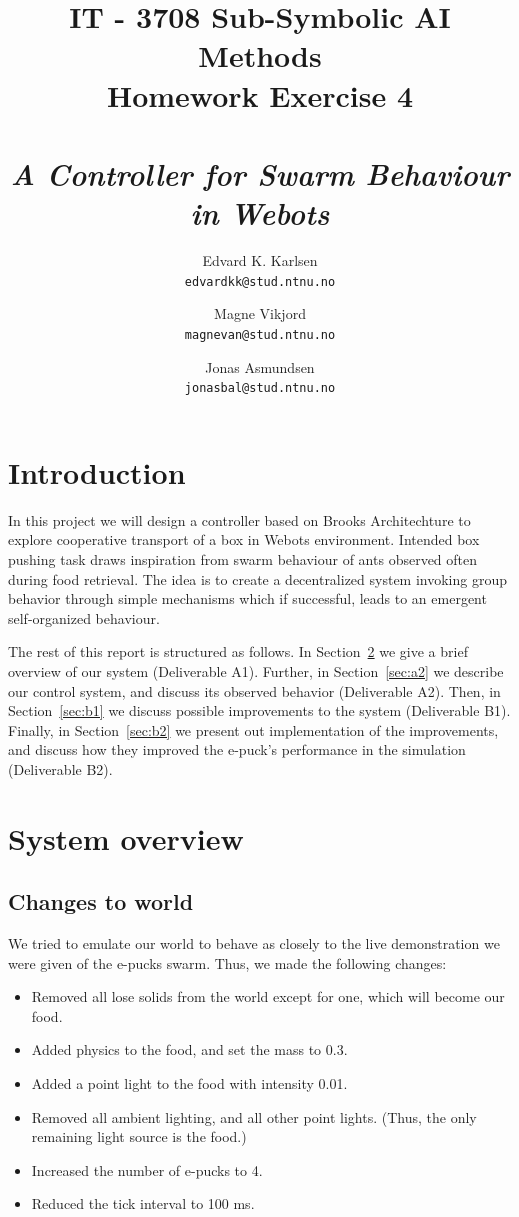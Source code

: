 \documentclass[a4paper,10pt]{article}
\title{
    IT - 3708 Sub-Symbolic AI Methods \\
    Homework Exercise 4\\
    ~\\
    \emph{A Controller for Swarm Behaviour in Webots}
}
\author{
    Edvard K. Karlsen \\
    \texttt{edvardkk@stud.ntnu.no}
    \and
    Magne Vikjord \\
    \texttt{magnevan@stud.ntnu.no}
    \and
    Jonas Asmundsen \\
    \texttt{jonasbal@stud.ntnu.no}
}
\date {}
\newcommand{\numbots}{4}
\newcommand{\foodmass}{0.3}
\newcommand{\lightintensity}{0.01}
\newcommand{\tickinterval}{100 ms}
\begin{document}
\maketitle

\section{Introduction}
In this project we will design a controller based on Brooks Architechture to
explore cooperative transport of a box in Webots environment. Intended box
pushing task draws inspiration from swarm behaviour of ants observed often
during food retrieval. The idea is to create a decentralized system invoking
group behavior through simple mechanisms which if successful, leads to an
emergent self-organized behaviour.

The rest of this report is structured as follows. In Section~\ref{sec:a1} we
give a brief overview of our system (Deliverable A1).  Further, in
Section~\ref{sec:a2} we describe our control system, and discuss its observed
behavior (Deliverable A2). Then, in Section~\ref{sec:b1} we discuss possible
improvements to the system (Deliverable B1). Finally, in Section~\ref{sec:b2}
we present out implementation of the improvements, and discuss how they
improved the e-puck's performance in the simulation (Deliverable B2).

\section{System overview}
\label{sec:a1}

\subsection{Changes to world}
We tried to emulate our world to behave as closely to the live demonstration
we were given of the e-pucks swarm. Thus, we made the following changes:

\begin{itemize}
    \item Removed all lose solids from the world except for one, which will
    become our food.
    \item Added physics to the food, and set the mass to \foodmass.
    \item Added a point light to the food with intensity \lightintensity.
    \item Removed all ambient lighting, and all other point lights. (Thus, the
    only remaining light source is the food.)
    \item Increased the number of e-pucks to \numbots.
    \item Reduced the tick interval to \tickinterval.
\end{itemize}
\end{document}

